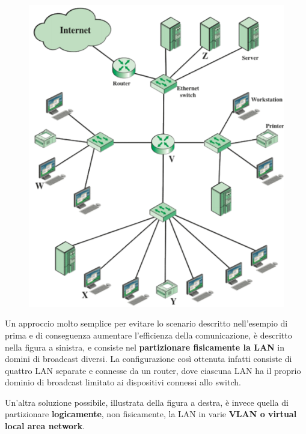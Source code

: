 \documentclass[11pt,a4paper,oneside]{book}
\theoremstyle{definition}
\begin{document}
\begin{figure}
	\includegraphics[scale=0.35]{Immagini/Vlan1.png}
	\centering
\end{figure}
Un approccio molto semplice per evitare lo scenario descritto nell'esempio di prima e di conseguenza aumentare l'efficienza della comunicazione, è descritto nella figura a sinistra, e consiste nel \textbf{partizionare fisicamente la LAN} in domini di broadcast diversi. La configurazione così ottenuta infatti consiste di quattro LAN separate e connesse da un router, dove ciascuna LAN ha il proprio dominio di broadcast limitato ai dispositivi connessi allo switch.

Un'altra soluzione possibile, illustrata della figura a destra, è invece quella di partizionare \textbf{logicamente}, non fisicamente, la LAN in varie \textbf{VLAN o virtual local area network}.
\end{document}
